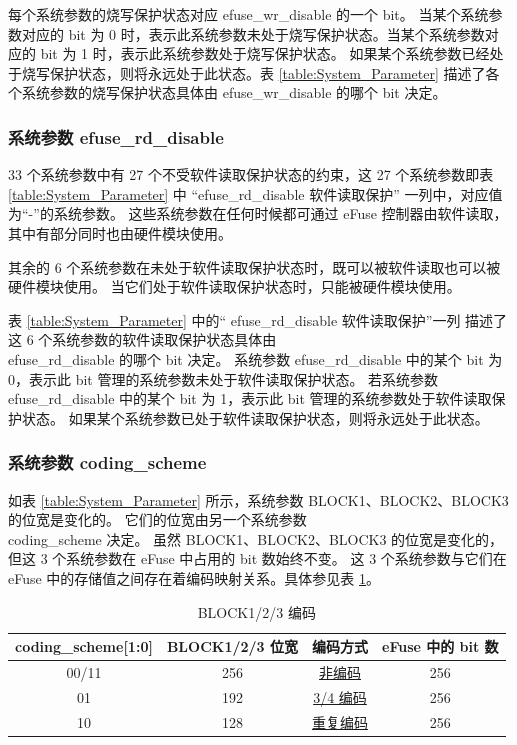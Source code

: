 \documentclass[main\_\_CN.tex]{subfiles}
\begin{document}
每个系统参数的烧写保护状态对应 efuse\_wr\_disable 的一个 bit。
当某个系统参数对应的 bit 为 0 时，表示此系统参数未处于烧写保护状态。当某个系统参数对应的 bit 为 1 时，表示此系统参数处于烧写保护状态。
如果某个系统参数已经处于烧写保护状态，则将永远处于此状态。表 \ref{table:System_Parameter} 描述了各个系统参数的烧写保护状态具体由 efuse\_wr\_disable 的哪个 bit 决定。

\subsubsection{系统参数 efuse\_rd\_disable}

33 个系统参数中有 27 个不受软件读取保护状态的约束，这 27 个系统参数即表 \ref{table:System_Parameter} 中
“efuse\_rd\_disable 软件读取保护” 一列中，对应值为“-”的系统参数。
这些系统参数在任何时候都可通过 eFuse 控制器由软件读取，其中有部分同时也由硬件模块使用。

其余的 6 个系统参数在未处于软件读取保护状态时，既可以被软件读取也可以被硬件模块使用。
当它们处于软件读取保护状态时，只能被硬件模块使用。

表 \ref{table:System_Parameter} 中的“ efuse\_rd\_disable 软件读取保护”一列
描述了这 6 个系统参数的软件读取保护状态具体由 \\efuse\_rd\_disable 的哪个 bit 决定。
系统参数 efuse\_rd\_disable 中的某个 bit 为 0，表示此 bit 管理的系统参数未处于软件读取保护状态。
若系统参数 efuse\_rd\_disable 中的某个 bit 为 1，表示此 bit 管理的系统参数处于软件读取保护状态。
如果某个系统参数已处于软件读取保护状态，则将永远处于此状态。

\subsubsection{系统参数 coding\_scheme}

如表 \ref{table:System_Parameter} 所示，系统参数 BLOCK1、BLOCK2、BLOCK3 的位宽是变化的。
它们的位宽由另一个系统参数 \\coding\_scheme 决定。
虽然 BLOCK1、BLOCK2、BLOCK3 的位宽是变化的，但这 3 个系统参数在 eFuse 中占用的 bit 数始终不变。
这 3 个系统参数与它们在 eFuse 中的存储值之间存在着编码映射关系。具体参见表 \ref{table:BLOCKN_Encode}。

\begin{table}[H]
    \centering
    \caption{BLOCK1/2/3 编码}
    \label{table:BLOCKN_Encode}
    \begin{tabular}{|c|c|c|c|}
        \hline
        \rowcolor{lightgray}
        coding\_scheme[1:0] & BLOCK1/2/3 位宽& 编码方式 & eFuse 中的 bit 数 \\
        \hline
        00/11 & 256 & \hyperlink{None}{非编码} & 256 \\
        \hline
        01 & 192 & \hyperlink{frac_3_4}{3/4 编码} & 256 \\
        \hline
        10 & 128 & \hyperlink{Repeat}{重复编码} & 256 \\
        \hline
    \end{tabular}
\end{table}
\end{document}
